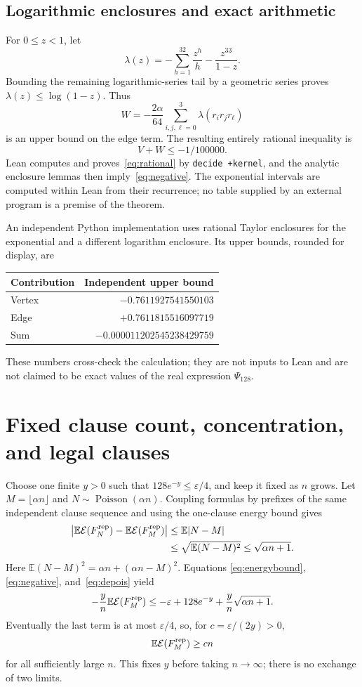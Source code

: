 \documentclass[11pt]{article}
\theoremstyle{remark}
\newcommand{\E}{\mathbb{E}}
\newcommand{\Pois}{\operatorname{Poisson}}
\newcommand{\en}{\mathcal{E}}
\newcommand{\code}[1]{\texttt{\small #1}}
\begin{document}
\subsection{Logarithmic enclosures and exact arithmetic}
For $0\leq z<1$, let
\[
 \lambda(z)=-\sum_{h=1}^{32}\frac{z^h}{h}-\frac{z^{33}}{1-z}.
\]
Bounding the remaining logarithmic-series tail by a geometric series
proves $\lambda(z)\leq\log(1-z)$. Thus
\[
 W=-\frac{2\alpha}{64}\sum_{i,j,\ell=0}^3
                   \lambda(r_ir_jr_\ell)
\]
is an upper bound on the edge term. The resulting entirely
rational inequality is
\begin{equation}\label{eq:rational}
 V+W\leq-1/100000.
\end{equation}
Lean computes and proves~\eqref{eq:rational} by \code{decide +kernel},
and the analytic enclosure lemmas then imply~\eqref{eq:negative}.
The exponential intervals are computed within Lean from their recurrence;
no table supplied by an external program is a premise of the theorem.

An independent Python implementation uses rational Taylor enclosures
for the exponential and a different logarithm enclosure. Its upper
bounds, rounded for display, are
\begin{center}
\begin{tabular}{lr}
\toprule
Contribution & Independent upper bound \\
\midrule
Vertex & $-0.7611927541550103$\\
Edge & $+0.7611815516097719$\\
Sum & $-0.000011202545238429759$\\
\bottomrule
\end{tabular}
\end{center}
These numbers cross-check the calculation; they are not inputs to Lean
and are not claimed to be exact values of the real expression $\Psi_{128}$.

\section{Fixed clause count, concentration, and legal clauses}
Choose one finite $y>0$ such that $128e^{-y}\leq\varepsilon/4$, and keep
it fixed as $n$ grows. Let $M=\lfloor\alpha n\rfloor$ and
$N\sim\Pois(\alpha n)$. Coupling formulas by prefixes of the same
independent clause sequence and using the one-clause energy bound gives
\begin{align}
 \bigl|\E\en(F^{\rm rep}_N)-\E\en(F^{\rm rep}_M)\bigr|
 &\leq\E|N-M|\nonumber\\
 &\leq\sqrt{\E(N-M)^2}\leq\sqrt{\alpha n+1}.\label{eq:depois}
\end{align}
Here $\E(N-M)^2=\alpha n+(\alpha n-M)^2$. Equations
\eqref{eq:energybound}, \eqref{eq:negative}, and~\eqref{eq:depois} yield
\[
 -\frac yn\E\en(F^{\rm rep}_M)
 \leq-\varepsilon+128e^{-y}+\frac yn\sqrt{\alpha n+1}.
\]
Eventually the last term is at most $\varepsilon/4$, so, for
$c=\varepsilon/(2y)>0$,
\begin{equation}\label{eq:linear}
 \E\en(F^{\rm rep}_M)\geq cn
\end{equation}
for all sufficiently large $n$. This fixes $y$ before taking $n\to\infty$;
there is no exchange of two limits.
\end{document}
